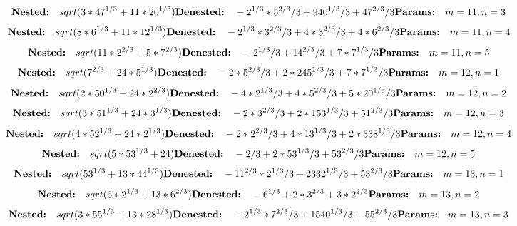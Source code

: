\[
\textbf{Nested:}\quad sqrt(3*47^{1/3} + 11*20^{1/3}) \\
\textbf{Denested:}\quad -2^{1/3}*5^{2/3}/3 + 940^{1/3}/3 + 47^{2/3}/3 \\
\textbf{Params:}\quad m=11, n=3
\]
\[
\textbf{Nested:}\quad sqrt(8*6^{1/3} + 11*12^{1/3}) \\
\textbf{Denested:}\quad -2^{1/3}*3^{2/3}/3 + 4*3^{2/3}/3 + 4*6^{2/3}/3 \\
\textbf{Params:}\quad m=11, n=4
\]
\[
\textbf{Nested:}\quad sqrt(11*2^{2/3} + 5*7^{2/3}) \\
\textbf{Denested:}\quad -2^{1/3}/3 + 14^{2/3}/3 + 7*7^{1/3}/3 \\
\textbf{Params:}\quad m=11, n=5
\]
\[
\textbf{Nested:}\quad sqrt(7^{2/3} + 24*5^{1/3}) \\
\textbf{Denested:}\quad -2*5^{2/3}/3 + 2*245^{1/3}/3 + 7*7^{1/3}/3 \\
\textbf{Params:}\quad m=12, n=1
\]
\[
\textbf{Nested:}\quad sqrt(2*50^{1/3} + 24*2^{2/3}) \\
\textbf{Denested:}\quad -4*2^{1/3}/3 + 4*5^{2/3}/3 + 5*20^{1/3}/3 \\
\textbf{Params:}\quad m=12, n=2
\]
\[
\textbf{Nested:}\quad sqrt(3*51^{1/3} + 24*3^{1/3}) \\
\textbf{Denested:}\quad -2*3^{2/3}/3 + 2*153^{1/3}/3 + 51^{2/3}/3 \\
\textbf{Params:}\quad m=12, n=3
\]
\[
\textbf{Nested:}\quad sqrt(4*52^{1/3} + 24*2^{1/3}) \\
\textbf{Denested:}\quad -2*2^{2/3}/3 + 4*13^{1/3}/3 + 2*338^{1/3}/3 \\
\textbf{Params:}\quad m=12, n=4
\]
\[
\textbf{Nested:}\quad sqrt(5*53^{1/3} + 24) \\
\textbf{Denested:}\quad -2/3 + 2*53^{1/3}/3 + 53^{2/3}/3 \\
\textbf{Params:}\quad m=12, n=5
\]
\[
\textbf{Nested:}\quad sqrt(53^{1/3} + 13*44^{1/3}) \\
\textbf{Denested:}\quad -11^{2/3}*2^{1/3}/3 + 2332^{1/3}/3 + 53^{2/3}/3 \\
\textbf{Params:}\quad m=13, n=1
\]
\[
\textbf{Nested:}\quad sqrt(6*2^{1/3} + 13*6^{2/3}) \\
\textbf{Denested:}\quad -6^{1/3} + 2*3^{2/3} + 3*2^{2/3} \\
\textbf{Params:}\quad m=13, n=2
\]
\[
\textbf{Nested:}\quad sqrt(3*55^{1/3} + 13*28^{1/3}) \\
\textbf{Denested:}\quad -2^{1/3}*7^{2/3}/3 + 1540^{1/3}/3 + 55^{2/3}/3 \\
\textbf{Params:}\quad m=13, n=3
\]
